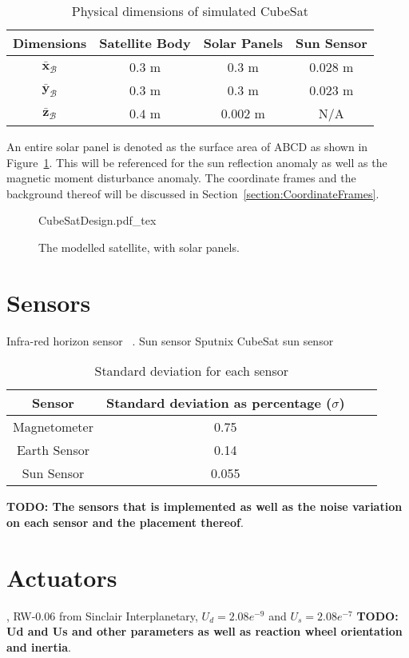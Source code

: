 \begin{table}[h!t!b]
	\centering
	\caption{\label{Table:Dimensions}Physical dimensions of simulated CubeSat}
	\begin{tabular}{c c c c}
		\hline\hline
		Dimensions & Satellite Body & Solar Panels & Sun Sensor \\ \hline
		$\bar{\mathbf{x}}_\mathcal{B}$          & $0.3$ m                    & $0.3$ m                       & $0.028$ m                   \\
		$\bar{\mathbf{y}}_\mathcal{B}$          & $0.3$ m                    & $0.3$ m                       & $0.023$ m                   \\
		$\bar{\mathbf{z}}_\mathcal{B}$          & $0.4$ m                    & $0.002$ m                     & N/A                     \\
		\hline\hline
	\end{tabular}
\end{table}

An entire solar panel is denoted as the surface area of ABCD as shown in Figure~\ref{fig:CubeSatDesign}. This will be referenced for the sun reflection anomaly as well as the magnetic moment disturbance anomaly. The coordinate frames and the background thereof will be discussed in Section~\ref{section:CoordinateFrames}.

\begin{figure}[h!t!b]
	\centering
	\def\svgwidth{14cm}
	{CubeSatDesign.pdf_tex}
	\caption{The modelled satellite, with solar panels.}
	\label{fig:CubeSatDesign}
\end{figure}

\section{Sensors}
Infra-red horizon sensor ~\cite{wessels2018infrared}. 
Sun sensor Sputnix CubeSat sun sensor
\begin{table}[h!t!b]
	\centering
	\caption{\label{Table:SensorNoise}Standard deviation for each sensor}
	\begin{tabular}{c c c c}
		\hline\hline
		\textbf{Sensor} & Standard deviation as percentage ($\sigma$) \\ \hline
		Magnetometer & 0.75 \\
		Earth Sensor & 0.14 \\
		Sun Sensor & 0.055 \\
		\hline\hline
	\end{tabular}
\end{table}
\textbf{TODO: The sensors that is implemented as well as the noise variation on each sensor and the placement thereof}.

\section{Actuators}
, RW-0.06 from Sinclair Interplanetary, $U_d = 2.08e^{-9}$ and $U_s = 2.08e^{-7}$
\textbf{TODO: Ud and Us and other parameters as well as reaction wheel orientation and inertia}.